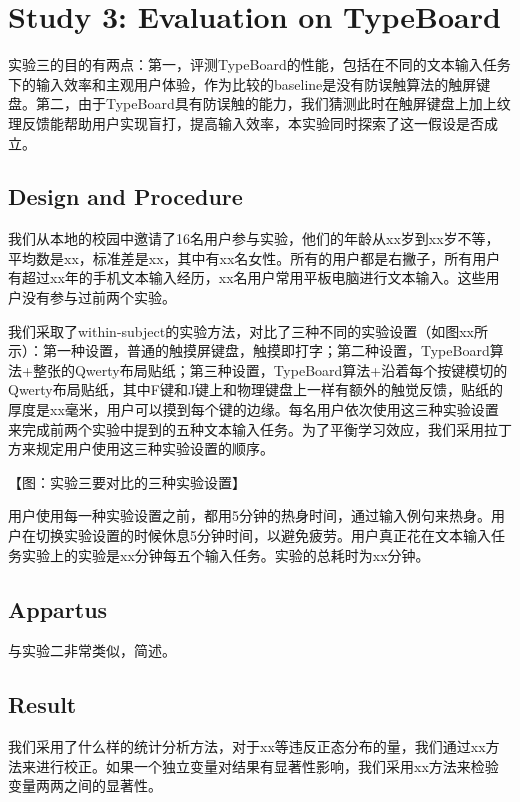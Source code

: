 \section{Study 3: Evaluation on TypeBoard}

实验三的目的有两点：第一，评测TypeBoard的性能，包括在不同的文本输入任务下的输入效率和主观用户体验，作为比较的baseline是没有防误触算法的触屏键盘。第二，由于TypeBoard具有防误触的能力，我们猜测此时在触屏键盘上加上纹理反馈能帮助用户实现盲打，提高输入效率，本实验同时探索了这一假设是否成立。

\subsection{Design and Procedure}

我们从本地的校园中邀请了16名用户参与实验，他们的年龄从xx岁到xx岁不等，平均数是xx，标准差是xx，其中有xx名女性。所有的用户都是右撇子，所有用户有超过xx年的手机文本输入经历，xx名用户常用平板电脑进行文本输入。这些用户没有参与过前两个实验。

我们采取了within-subject的实验方法，对比了三种不同的实验设置（如图xx所示）：第一种设置，普通的触摸屏键盘，触摸即打字；第二种设置，TypeBoard算法+整张的Qwerty布局贴纸；第三种设置，TypeBoard算法+沿着每个按键模切的Qwerty布局贴纸，其中F键和J键上和物理键盘上一样有额外的触觉反馈，贴纸的厚度是xx毫米，用户可以摸到每个键的边缘。每名用户依次使用这三种实验设置来完成前两个实验中提到的五种文本输入任务。为了平衡学习效应，我们采用拉丁方来规定用户使用这三种实验设置的顺序。

【图：实验三要对比的三种实验设置】

用户使用每一种实验设置之前，都用5分钟的热身时间，通过输入例句来热身。用户在切换实验设置的时候休息5分钟时间，以避免疲劳。用户真正花在文本输入任务实验上的实验是xx分钟每五个输入任务。实验的总耗时为xx分钟。

\subsection{Appartus}

与实验二非常类似，简述。

\subsection{Result}

我们采用了什么样的统计分析方法，对于xx等违反正态分布的量，我们通过xx方法来进行校正。如果一个独立变量对结果有显著性影响，我们采用xx方法来检验变量两两之间的显著性。


